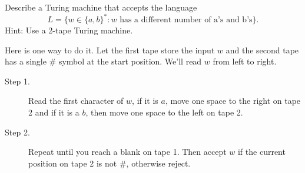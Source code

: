 \documentclass[12pt]{exam}
\begin{document}
\begin{questions}
\question Describe a Turing machine that accepts the language 
$$L = \{w \in \{a, b\}^* : w \text{ has a different number of a's and b's} \}.$$
Hint: Use a 2-tape Turing machine.
\begin{solution}
Here is one way to do it. Let the first tape store the input $w$ and the second tape has a single $\#$ symbol at the start position. We'll read $w$ from left to right.
\begin{description}
\item[Step 1.] Read the first character of $w$, if it is $a$, move one space to the right on tape 2 and if it is a $b$, then move one space to the left on tape 2. 
\item[Step 2.] Repeat until you reach a blank on tape 1.  Then accept $w$ if the current position on tape 2 is not $\#$, otherwise reject. 
\end{description}
\end{solution}
\vfill

\end{questions}
\end{document}
